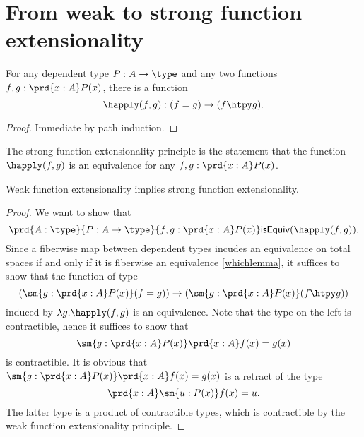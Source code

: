 \section{From weak to strong function extensionality}

\begin{lem}
For any dependent type $P:A\to\type$ and any two functions $f,g:\prd{x:A}P(x)$, there is a function
\begin{equation*}
\happly (f,g):(f= g)\to(f\htpy g).
\end{equation*}
\end{lem}

\begin{proof}
Immediate by path induction.
\end{proof}

\begin{defn}
The strong function extensionality principle is the statement that the function $\happly (f,g)$ is an equivalence for any $f,g:\prd{x:A}P(x)$. 
\end{defn}

\begin{thm}
Weak function extensionality implies strong function extensionality.
\end{thm}

\begin{proof}
We want to show that
\begin{equation*}
\prd{A:\type}{P:A\to\type}{f,g:\prd{x:A}P(x)}\mathsf{isEquiv}(\happly (f,g)).
\end{equation*}
Since a fiberwise map between dependent types incudes an equivalence on total spaces
if and only if it is fiberwise an equivalence \ref{whichlemma}, it suffices to show that the function of type
\begin{equation*}
(\sm{g:\prd{x:A}P(x)}(f= g))\to(\sm{g:\prd{x:A}P(x)}(f\htpy g))
\end{equation*}
induced by $\lambda g.\happly (f,g)$ is an equivalence. Note that the type on the left is contractible, hence it suffices to show that
\begin{equation*}
\sm{g:\prd{x:A}P(x)}\prd{x:A}f(x)= g(x)
\end{equation*}
is contractible. It is obvious that $\sm{g:\prd{x:A}P(x)}\prd{x:A}f(x)= g(x)$ is a retract of the type
\begin{equation*}
\prd{x:A}\sm{u:P(x)}f(x)= u.
\end{equation*}
The latter type is a product of contractible types, which is contractible by the weak function extensionality principle.
\end{proof}

